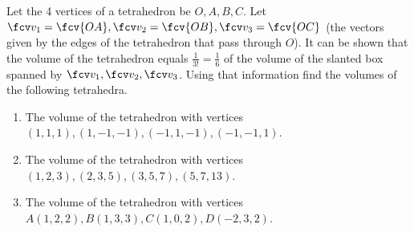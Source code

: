 Let the 4 vertices of a tetrahedron be $O, A, B, C$. Let $\fcv v_1=\fcv{OA}, \fcv v_2=\fcv{OB}, \fcv v_3=\fcv{OC}$ (the vectors given by the edges of the tetrahedron that pass through $O$). It can be shown that the volume of the tetrahedron equals $\frac{1}{3! } =\frac{1}{6}$ of the volume of the slanted box spanned by $\fcv v_1, \fcv v_2, \fcv v_3$. Using that information find the volumes of the following tetrahedra.
\begin{enumerate}
\item The volume of the tetrahedron with vertices $(1,1,1), (1,-1,-1), (-1,1,-1), (-1,-1,1)$.
\item The volume of the tetrahedron with vertices $(1,2,3), (2,3,5), (3,5,7), (5,7,13)$.

\item \label{problemVolumeTetrahedronVertices(1,2,2)(1,3,3),(1,0,2),(-2,3,2)} The volume of the tetrahedron with vertices $A(1, 2,2 ), B(1,3,3),C(1,0,2),D(-2,3,2)$.
\end{enumerate}
